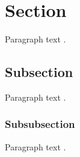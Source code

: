 



\section{Section} \label{section}

Paragraph text \cite{lastnamep:yearp}.




\subsection{Subsection} \label{subsection}

Paragraph text \cite{lastnamea:yeara}.




\subsubsection{Subsubsection} \label{subsubsection}

Paragraph text \cite{lastnamee:yeare}.

